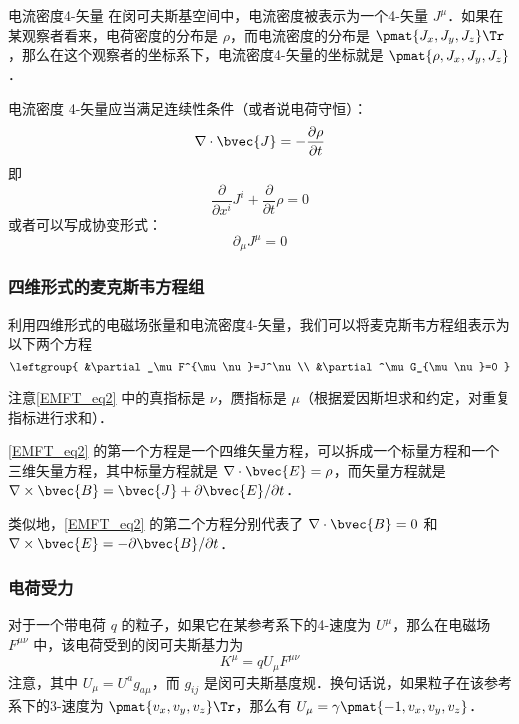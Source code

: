 \begin{definition}{电流密度4-矢量}
在闵可夫斯基空间中，电流密度被表示为一个4-矢量 $J^\mu$．如果在某观察者看来，电荷密度的分布是 $\rho$，而电流密度的分布是 $\pmat{J_x, J_y, J_z}\Tr$，那么在这个观察者的坐标系下，电流密度4-矢量的坐标就是 $\pmat{\rho, J_x, J_y, J_z}$．
\end{definition}

电流密度 4-矢量应当满足连续性条件（或者说电荷守恒）：
\begin{equation}
\nabla\cdot\bvec{J}=-\frac{\partial\rho}{\partial t}
\end{equation}
即
\begin{equation}
\frac{\partial}{\partial x^i}J^i+\frac{\partial}{\partial t}\rho=0
\end{equation}
或者可以写成协变形式：
\begin{equation}
\partial_\mu J^\mu=0
\end{equation}
\subsubsection{四维形式的麦克斯韦方程组}

利用四维形式的电磁场张量和电流密度4-矢量，我们可以将麦克斯韦方程组表示为以下两个方程
\begin{equation}\label{EMFT_eq2}
\leftgroup{
    &\partial_\mu F^{\mu\nu}=J^\nu\\
    &\partial^\mu G_{\mu\nu}=0
}
\end{equation}

注意\autoref{EMFT_eq2} 中的真指标是 $\nu$，赝指标是 $\mu$（根据爱因斯坦求和约定，对重复指标进行求和）．

\autoref{EMFT_eq2} 的第一个方程是一个四维矢量方程，可以拆成一个标量方程和一个三维矢量方程，其中标量方程就是 $\nabla\cdot\bvec{E}=\rho$，而矢量方程就是 $\nabla\times\bvec{B}=\bvec{J}+\partial\bvec{E}/\partial t$． 

类似地，\autoref{EMFT_eq2} 的第二个方程分别代表了 $\nabla\cdot\bvec{B}=0$ 和 $\nabla\times\bvec{E}=-\partial\bvec{B}/\partial t$．

\subsubsection{电荷受力}

对于一个带电荷 $q$ 的粒子，如果它在某参考系下的4-速度为 $U^\mu$，那么在电磁场 $F^{\mu\nu}$ 中，该电荷受到的闵可夫斯基力为
\begin{equation}\label{EMFT_eq3}
K^{\mu}=qU_\mu F^{\mu\nu}
\end{equation}
注意，其中 $U_\mu=U^ag_{a\mu}$，而 $g_{ij}$ 是闵可夫斯基度规．换句话说，如果粒子在该参考系下的3-速度为 $\pmat{v_x, v_y, v_z}\Tr$，那么有 $U_\mu=\gamma\pmat{-1, v_x, v_y, v_z}$．

